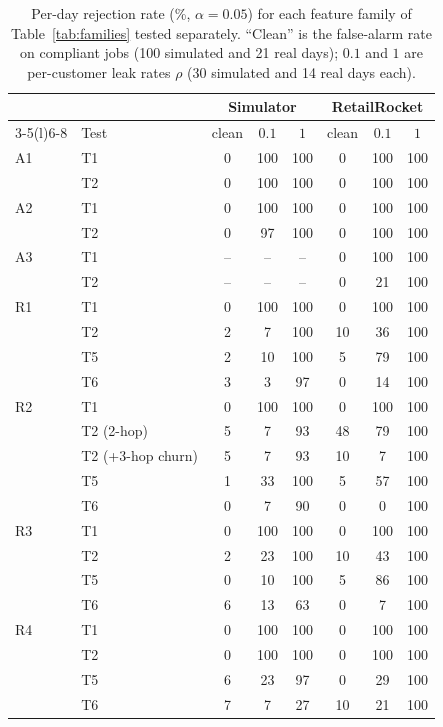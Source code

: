 \documentclass[10pt,twocolumn,letterpaper]{article}
\theoremstyle{definition}
\begin{document}
\begin{table}[t]
\centering\footnotesize
\setlength{\tabcolsep}{2.6pt}
\begin{tabular}{@{}llcccccc@{}}
\toprule
 & & \multicolumn{3}{c}{Simulator} & \multicolumn{3}{c}{RetailRocket} \\
\cmidrule(lr){3-5}\cmidrule(l){6-8}
 & Test & clean & $0.1$ & $1$ & clean & $0.1$ & $1$ \\
\midrule
A1 & T1 & 0 & 100 & 100 & 0 & 100 & 100 \\
 & T2 & 0 & 100 & 100 & 0 & 100 & 100 \\
\addlinespace[1pt]
A2 & T1 & 0 & 100 & 100 & 0 & 100 & 100 \\
 & T2 & 0 & 97 & 100 & 0 & 100 & 100 \\
\addlinespace[1pt]
A3 & T1 & -- & -- & -- & 0 & 100 & 100 \\
 & T2 & -- & -- & -- & 0 & 21 & 100 \\
\addlinespace[1pt]
R1 & T1 & 0 & 100 & 100 & 0 & 100 & 100 \\
 & T2 & 2 & 7 & 100 & 10 & 36 & 100 \\
 & T5 & 2 & 10 & 100 & 5 & 79 & 100 \\
 & T6 & 3 & 3 & 97 & 0 & 14 & 100 \\
\addlinespace[1pt]
R2 & T1 & 0 & 100 & 100 & 0 & 100 & 100 \\
 & T2 (2-hop) & 5 & 7 & 93 & 48 & 79 & 100 \\
 & T2 (+3-hop churn) & 5 & 7 & 93 & 10 & 7 & 100 \\
 & T5 & 1 & 33 & 100 & 5 & 57 & 100 \\
 & T6 & 0 & 7 & 90 & 0 & 0 & 100 \\
\addlinespace[1pt]
R3 & T1 & 0 & 100 & 100 & 0 & 100 & 100 \\
 & T2 & 2 & 23 & 100 & 10 & 43 & 100 \\
 & T5 & 0 & 10 & 100 & 5 & 86 & 100 \\
 & T6 & 6 & 13 & 63 & 0 & 7 & 100 \\
\addlinespace[1pt]
R4 & T1 & 0 & 100 & 100 & 0 & 100 & 100 \\
 & T2 & 0 & 100 & 100 & 0 & 100 & 100 \\
 & T5 & 6 & 23 & 97 & 0 & 29 & 100 \\
 & T6 & 7 & 7 & 27 & 10 & 21 & 100 \\
\bottomrule
\end{tabular}
\caption{Per-day rejection rate (\%, $\alpha=0.05$) for each feature family of Table~\ref{tab:families} tested separately. ``Clean'' is the false-alarm rate on compliant jobs (100 simulated and 21 real days); $0.1$ and $1$ are per-customer leak rates $\rho$ (30 simulated and 14 real days each).}
\label{tab:famres}
\end{table}
\end{document}
